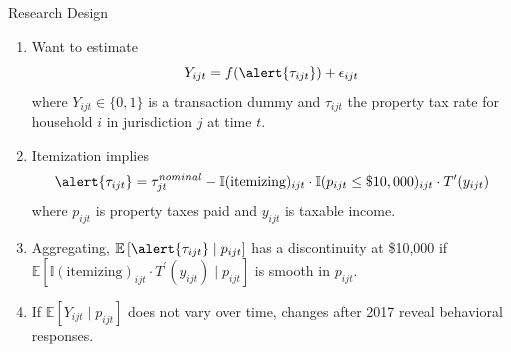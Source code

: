 \documentclass[10pt, aspectratio=169]{beamer}
\begin{document}
\begin{frame}[label=Math]{Research Design}
\begin{enumerate}
    \item Want to estimate 
        \begin{equation}
            Y_{ijt} = f(\alert{\tau_{ijt}}) + \epsilon_{ijt}
        \end{equation}
        where $Y_{ijt} \in \{0, 1\}$ is a transaction dummy and \alert{$\tau_{ijt}$} the property tax rate for household $i$ in jurisdiction $j$ at time $t$.
    \item Itemization implies
        \begin{equation}
            \alert{\tau_{ijt}} = \tau_{jt}^{nominal} - \mathbb{I}(\text{itemizing})_{ijt}\cdot \mathbb{I}(p_{ijt} \leq  \$10,000)_{ijt} \cdot T^\prime(y_{ijt})
        \end{equation}
        where $p_{ijt}$ is property taxes paid and $y_{ijt}$ is taxable income.
    \item Aggregating, $\mathbb{E}\left[\alert{\tau_{ijt}}\mid p_{ijt}\right]$ has a discontinuity at \$10,000 if $\mathbb{E}\left[\mathbb{I}(\text{itemizing})_{ijt}\cdot T^\prime(y_{ijt}) \mid p_{ijt}\right]$ is smooth in $p_{ijt}$.
    \item If $\mathbb{E}\left[Y_{ijt} \mid p_{ijt} \right]$ does not vary over time, changes after 2017 reveal behavioral responses.
\end{enumerate}
\end{frame}
\end{document}

